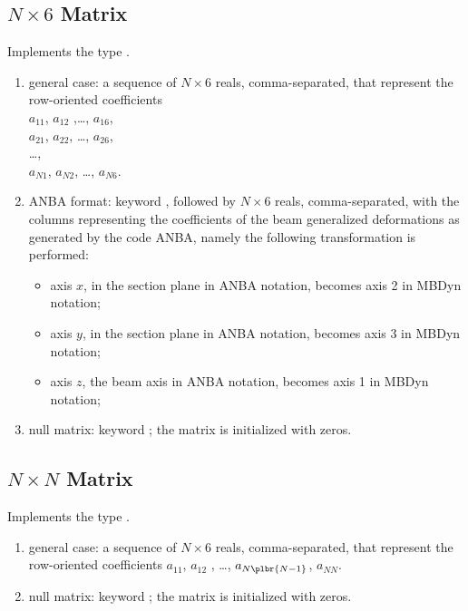 \subsection{$N \times 6$ Matrix}
\label{sec:MatNx6}
Implements the type .
\begin{enumerate}
    \item general case: a sequence of $N \times 6$ reals, comma-separated, that
    represent the row-oriented coefficients \\
    $ a_{11} $, $ a_{12}$ ,\ldots, $ a_{16}$,\\
    $ a_{21}$, $ a_{22}$, \ldots, $ a_{26}$,\\
    \ldots, \\
    $ a_{N1} $, $ a_{N2} $, \ldots, $ a_{N6}$.\\
    \item ANBA format: keyword , followed by $N \times 6$ reals,
    comma-separated, with the columns representing the coefficients of the beam  
    generalized deformations as generated by the code ANBA, namely the following
    transformation is performed:
    \begin{itemize}
        \item axis $ x $, in the section plane in ANBA notation, 
	becomes axis 2 in MBDyn notation;    
	\item axis $ y $, in the section plane in ANBA notation, 
	becomes axis 3 in MBDyn notation;    
	\item axis $ z $, the beam axis in ANBA notation, 
	becomes axis 1 in MBDyn notation;    
    \end{itemize}
    \item null matrix: keyword ; the matrix is initialized 
    with zeros.
\end{enumerate}

\subsection{$N \times N$ Matrix}
\label{sec:MatNxN}
Implements the type .
\begin{enumerate}
    \item general case: a sequence of $N \times 6$ reals, comma-separated, that
    represent the row-oriented coefficients $ a_{11} $, $ a_{12}$ ,
    \ldots, $ a_{N\plbr{N-1}} $, $ a_{NN} $.
    \item null matrix: keyword ; the matrix is initialized 
    with zeros.
\end{enumerate}


